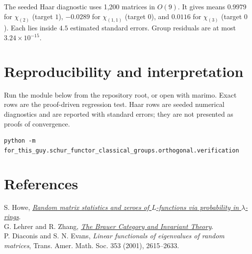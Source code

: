 \documentclass[11pt]{article}
\begin{document}
The seeded Haar diagnostic uses 1,200 matrices in $O(9)$. It gives means $0.9979$ for $\chi_{(2)}$ (target $1$), $-0.0289$ for $\chi_{(1,1)}$ (target $0$), and $0.0116$ for $\chi_{(3)}$ (target $0$). Each lies inside $4.5$ estimated standard errors. Group residuals are at most $3.24\times10^{-15}$.

\section{Reproducibility and interpretation}
Run the module below from the repository root, or open  with marimo. Exact rows are the proof-driven regression test. Haar rows are seeded numerical diagnostics and are reported with standard errors; they are not presented as proofs of convergence.
\begin{center}\footnotesize\texttt{python -m for\_this\_guy.schur\_functor\_classical\_groups.orthogonal.verification}\end{center}

\section*{References}
S. Howe, \href{https://arxiv.org/abs/2412.19295}{\emph{Random matrix statistics and zeroes of $L$-functions via probability in $\lambda$-rings}}.\\
G. Lehrer and R. Zhang, \href{https://arxiv.org/abs/1207.5889}{\emph{The Brauer Category and Invariant Theory}}.
\\P. Diaconis and S. N. Evans, \emph{Linear functionals of eigenvalues of
random matrices}, Trans. Amer. Math. Soc. 353 (2001), 2615--2633.
\end{document}
